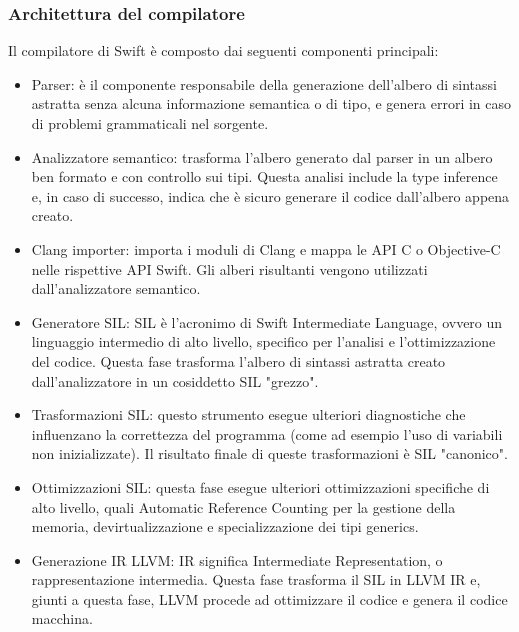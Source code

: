 \subsubsection{Architettura del compilatore}
Il compilatore di Swift è composto dai seguenti componenti principali:
\begin{itemize}
\item Parser: è il componente responsabile della generazione dell'albero di sintassi astratta senza alcuna informazione semantica o di tipo, e genera errori in caso di problemi grammaticali nel sorgente.
\item Analizzatore semantico: trasforma l'albero generato dal parser in un albero ben formato e con controllo sui tipi. Questa analisi include la type inference e, in caso di successo, indica che è sicuro generare il codice dall'albero appena creato.
\item Clang importer: importa i moduli di Clang e mappa le API C o Objective-C nelle rispettive API Swift. Gli alberi risultanti vengono utilizzati dall'analizzatore semantico.
\item Generatore SIL: SIL è l'acronimo di Swift Intermediate Language, ovvero un linguaggio intermedio di alto livello, specifico per l'analisi e l'ottimizzazione del codice. Questa fase trasforma l'albero di sintassi astratta creato dall'analizzatore in un cosiddetto SIL "grezzo".
\item Trasformazioni SIL: questo strumento esegue ulteriori diagnostiche che influenzano la correttezza del programma (come ad esempio l'uso di variabili non inizializzate). Il risultato finale di queste trasformazioni è SIL "canonico".
\item Ottimizzazioni SIL: questa fase esegue ulteriori ottimizzazioni specifiche di alto livello, quali Automatic Reference Counting per la gestione della memoria, devirtualizzazione e specializzazione dei tipi generics.
\item Generazione IR LLVM: IR significa Intermediate Representation, o rappresentazione intermedia. Questa fase trasforma il SIL in LLVM IR e, giunti a questa fase, LLVM procede ad ottimizzare il codice e genera il codice macchina.
\end{itemize}
